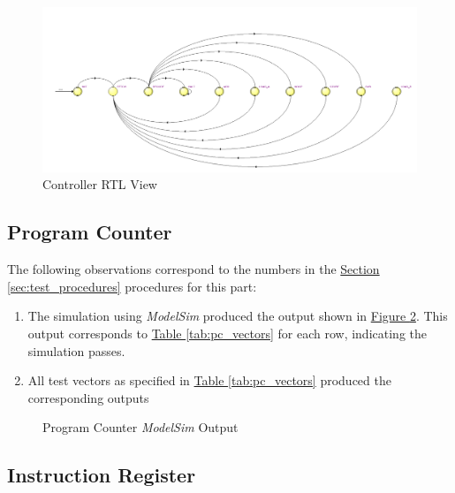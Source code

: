 \begin{figure}
    \includegraphics[width=\textwidth]{images/controller_rtl.png}
    \caption{Controller RTL View\label{fig:controller_rtl}}
\end{figure}


\subsection{Program Counter} %
\label{sub:program_counter}

The following observations correspond to the numbers in the \hyperref[sec:test_procedures]{Section \ref*{sec:test_procedures}} procedures for this part:

\begin{enumerate}
    \item The simulation using \emph{ModelSim} produced the output shown in \hyperref[fig:pc_output]{Figure \ref*{fig:pc_output}}.
    This output corresponds to \hyperref[tab:pc_vectors]{Table \ref*{tab:pc_vectors}} for each row, indicating the simulation passes.
    \item All test vectors as specified in \hyperref[tab:pc_vectors]{Table \ref*{tab:pc_vectors}} produced the corresponding outputs
\end{enumerate}

\begin{figure}
    \caption{Program Counter \emph{ModelSim} Output\label{fig:pc_output}}
\end{figure}


\subsection{Instruction Register} %
\label{sub:instruction_register}

